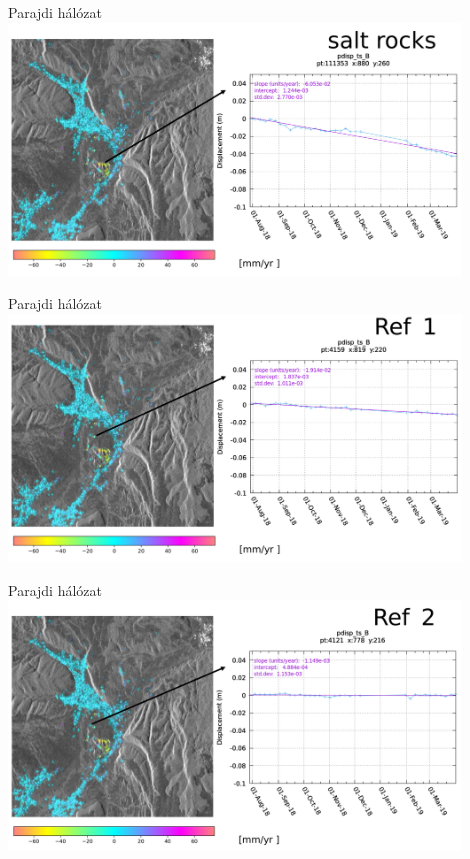 \documentclass{beamer}
\begin{document}
\begin{frame}{Parajdi hálózat}
\includegraphics[width=0.9\textwidth]{parajd_ts1.png}
\end{frame}


\begin{frame}{Parajdi hálózat}
\includegraphics[width=0.9\textwidth]{parajd_ts2.png}
\end{frame}

\begin{frame}{Parajdi hálózat}
\includegraphics[width=0.9\textwidth]{parajd_ts3.png}
\end{frame}
\end{document}
